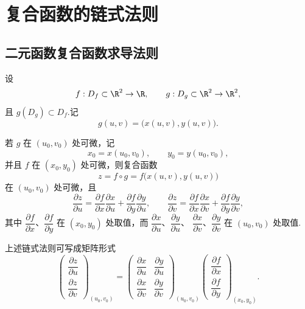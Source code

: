 \section{复合函数的链式法则}

\subsection*{二元函数复合函数求导法则}

设
\[
f:D_f\subset\R^2\to\R,
\qquad
g:D_g\subset\R^2\to\R^2,
\]
且 $g(D_g)\subset D_f$.记
\[
g(u,v)=\bigl(x(u,v),y(u,v)\bigr).
\]

\begin{theorem}
	若 $g$ 在 $(u_0,v_0)$ 处可微，记
	\[
	x_0=x(u_0,v_0),\qquad y_0=y(u_0,v_0),
	\]
	并且 $f$ 在 $(x_0,y_0)$ 处可微，则复合函数
	\[
	z=f\circ g=f\bigl(x(u,v),y(u,v)\bigr)
	\]
	在 $(u_0,v_0)$ 处可微，且
	\[
	\frac{\partial z}{\partial u}
	=
	\frac{\partial f}{\partial x}\frac{\partial x}{\partial u}
	+
	\frac{\partial f}{\partial y}\frac{\partial y}{\partial u},
	\qquad
	\frac{\partial z}{\partial v}
	=
	\frac{\partial f}{\partial x}\frac{\partial x}{\partial v}
	+
	\frac{\partial f}{\partial y}\frac{\partial y}{\partial v},
	\]
	其中 $\dfrac{\partial f}{\partial x}$、$\dfrac{\partial f}{\partial y}$
	在 $(x_0,y_0)$ 处取值，而
	$\dfrac{\partial x}{\partial u}$、$\dfrac{\partial y}{\partial u}$、
	$\dfrac{\partial x}{\partial v}$、$\dfrac{\partial y}{\partial v}$
	在 $(u_0,v_0)$ 处取值.
\end{theorem}

上述链式法则可写成矩阵形式
\[
\begin{pmatrix}
\dfrac{\partial z}{\partial u}\\[5pt]
\dfrac{\partial z}{\partial v}
\end{pmatrix}_{(u_0,v_0)}
=
\begin{pmatrix}
\dfrac{\partial x}{\partial u}
&\dfrac{\partial y}{\partial u}\\[5pt]
\dfrac{\partial x}{\partial v}
&\dfrac{\partial y}{\partial v}
\end{pmatrix}_{(u_0,v_0)}
\begin{pmatrix}
\dfrac{\partial f}{\partial x}\\[5pt]
\dfrac{\partial f}{\partial y}
\end{pmatrix}_{(x_0,y_0)}.
\]

